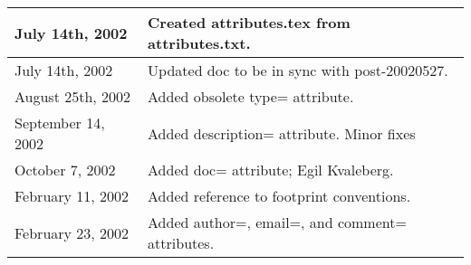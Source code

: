 \documentclass{article}
\begin{document}
\begin{table}[h]
\begin{tabular}{|l|l|} \hline
July 14th, 2002 & Created attributes.tex from attributes.txt. \\ \hline
July 14th, 2002 & Updated doc to be in sync with post-20020527. \\ \hline
August 25th, 2002 & Added obsolete type= attribute. \\ \hline
September 14, 2002 & Added description= attribute. Minor fixes\\ \hline
October 7, 2002 & Added doc= attribute; Egil Kvaleberg.\\ \hline
February 11, 2002 & Added reference to footprint conventions.\\ \hline
February 23, 2002 & Added author=, email=, and comment= attributes.\\ \hline

\end{tabular}
\end{table}
\end{document}
